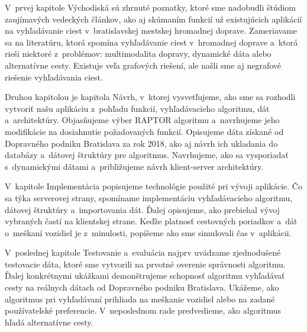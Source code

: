 V~prvej kapitole Východiská sú zhrnuté poznatky, ktoré sme nadobudli štúdiom zaujímavých vedeckých článkov, ako aj skúmaním funkcií už existujúcich aplikácií na vyhľadávanie ciest v~bratislavskej mestskej hromadnej doprave. Zameriavame sa na literatúru, ktorá spomína vyhľadávanie ciest v~hromadnej doprave a~ktorá rieši niektoré z~problémov: multimodalita dopravy, dynamické dáta alebo alternatívne cesty. Existuje veľa grafových riešení, ale našli sme aj negrafové riešenie vyhľadávania ciest. 

Druhou kapitolou je kapitola Návrh, v~ktorej vysvetľujeme, ako sme sa rozhodli vytvoriť našu aplikáciu z~pohľadu funkcií, vyhľadávacieho algoritmu, dát a~architektúry. Objasňujeme výber RAPTOR algoritmu a~navrhujeme jeho modifikácie na dosiahnutie požadovaných funkcií. Opisujeme dáta získané od Dopravného podniku Bratislava za rok 2018, ako aj návrh ich ukladania do databázy a~dátovej štruktúry pre algoritmus. Navrhujeme, ako sa vysporiadať s~dynamickými dátami a~približujeme návrh klient-server architektúry.

V~kapitole Implementácia popisujeme technológie použité pri vývoji aplikácie. Čo sa týka serverovej strany, spomíname implementáciu vyhľadávacieho algoritmu, dátovej štruktúry a~importovania dát. Ďalej opisujeme, ako prebiehal vývoj vybraných častí na klientskej strane. Keďže platnosť cestovných poriadkov a~dát o~meškaní vozidiel je z~minulosti, popíšeme ako sme simulovali čas v~aplikácii. 

V~poslednej kapitole Testovanie a~evaluácia najprv uvádzame zjednodušené testovacie dáta, ktoré sme vytvorili na prvotné overenie správnosti algoritmu. Ďalej konkrétnymi ukážkami demonštrujeme schopnosť algoritmu vyhľadávať cesty na reálnych dátach od Dopravného podniku Bratislava. Ukážeme, ako algoritmus pri vyhľadávaní prihliada na meškanie vozidiel alebo na zadané používateľské preferencie. V~neposlednom rade predvedieme, ako algoritmus hľadá alternatívne cesty. 


